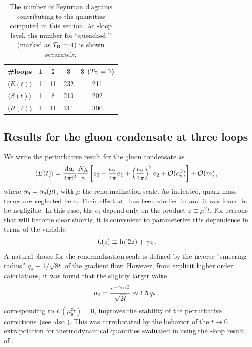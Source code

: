 \begin{table}
  \begin{center}
    \caption[]{\label{tab:numdias} The number of Feynman diagrams
      contributing to the quantities computed in this section. At
      \three-loop level, the number for ``quenched \qcd'' (marked as
      $T_\mathrm{R}=0$) is shown separately.}

    \begin{tabular}{|c||c|c|c|c|}
      \hline
      \#loops & 1 & 2 & 3 & 3  ($T_\mathrm{R}=0$)\\\hline\hline
      $\langle E(t)\rangle$ & 1 & 11 & 232 & 211 \\\hline
      $\langle S(t)\rangle$ & 1 & 8 & 210 & 202 \\\hline
      $\langle R(t)\rangle$ & 1 & 11 & 311 & 300 \\\hline
    \end{tabular}
  \end{center}
\end{table}


\subsection{Results for the gluon condensate at three loops}

We write the perturbative result for the gluon condensate as
\begin{equation}
  \langle E(t) \rangle = \frac{3\alpha_\mathrm{s}}{4\pi t^2} \frac{N_\mathrm{A}}{8}
  \left[e_0 + \frac{\alpha_\mathrm{s}}{4\pi} e_1 + \left(\frac{\alpha_\mathrm{s}}{4\pi}\right)^2 e_2 +
    \mathcal{O}(\alpha_\mathrm{s}^3)\right] + \mathcal{O}(m)\,,
  \label{eq:et}
\end{equation}
where $\alpha_\mathrm{s}=\alpha_\mathrm{s}(\mu)$, with $\mu$ the renormalization scale. As
indicated, quark mass terms are neglected here.
Their effect at \nlo\ has been studied in  and it was found to be negligible.
In this case, the
$e_i$ depend only on the product $z\equiv \mu^2t$. For reasons that will become
clear shortly, it is convenient to parameterize this dependence in
terms of the variable
\begin{equation}
  \begin{split}
    L(z) \equiv \ln(2z) + \gamma_\mathrm{E}\,.
  \end{split}
\end{equation}
A
natural choice for the renormalization scale is defined by the inverse
``smearing radius'' $q_8\equiv 1/\sqrt{8t}$ of the gradient
flow. However, from explicit higher order calculations, it was found
that the slightly larger value
\begin{equation}
  \begin{split}
    \mu_0 = \frac{e^{-\gamma_\mathrm{E}/2}}{\sqrt{2t}} \approx 1.5\,q_8\,,
    \label{eq:mu0}
  \end{split}
\end{equation}
corresponding to $L(\mu_0^2t)=0$, improves the stability of the
perturbative corrections\,\cite{Harlander:2018zpi} (see also
). This was corroborated by the behavior of
the $t\to 0$ extrapolation for thermodynamical quantities evaluated in
 using the \two-loop result of
.

